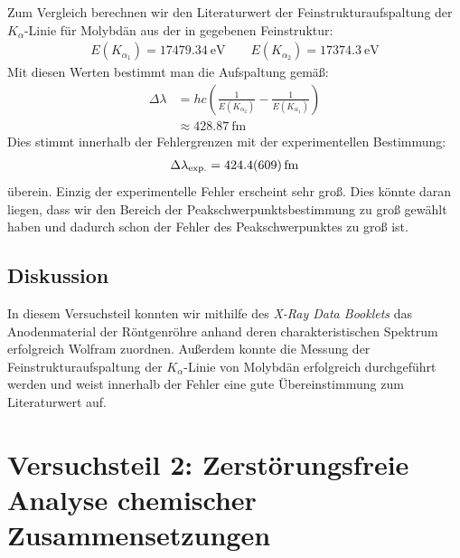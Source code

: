 \documentclass[11pt, a4paper]{article}
\begin{document}
Zum Vergleich berechnen wir den Literaturwert der Feinstrukturaufspaltung der $K_\alpha$-Linie für Molybdän aus der in \cite{booklet} gegebenen Feinstruktur:
\begin{align*}
  E(K_{\alpha_1}) = \SI{17479,34}{\electronvolt} \qquad E(K_{\alpha_2}) = \SI{17374,3}{\electronvolt}
\end{align*}
Mit diesen Werten bestimmt man die Aufspaltung gemäß:
\begin{align*}
  \Delta \lambda &= h c \left( \frac{1}{E(K_{\alpha_2})} - \frac{1}{E(K_{\alpha_1})} \right) \\
  &\approx \SI{428,87}{\femto\metre}
\end{align*}
Dies stimmt innerhalb der Fehlergrenzen mit der experimentellen Bestimmung:
\begin{align*}
  \Delta \lambda_\mathrm{exp.} = \SI{424,4+-60,9}{\femto\metre}
\end{align*}
überein.
Einzig der experimentelle Fehler erscheint sehr groß.
Dies könnte daran liegen, dass wir den Bereich der Peakschwerpunktsbestimmung zu groß gewählt haben und dadurch schon der Fehler des Peakschwerpunktes zu groß ist.

\subsection{Diskussion}
In diesem Versuchsteil konnten wir mithilfe des \emph{X-Ray Data Booklets} das Anodenmaterial der Röntgenröhre anhand deren charakteristischen Spektrum erfolgreich Wolfram zuordnen.
Außerdem konnte die Messung der Feinstrukturaufspaltung der $K_\alpha$-Linie von Molybdän erfolgreich durchgeführt werden und weist innerhalb der Fehler eine gute Übereinstimmung zum Literaturwert auf.

\section{Versuchsteil 2: Zerstörungsfreie Analyse chemischer Zusammensetzungen}
\end{document}
